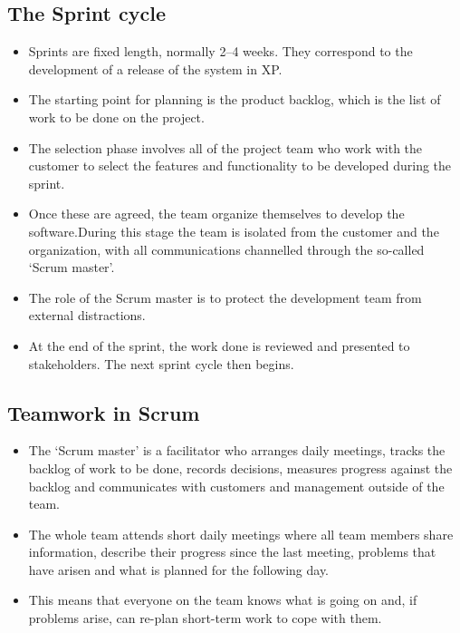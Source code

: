 \subsection{ The Sprint cycle}
\begin{itemize}

\item Sprints are fixed length, normally 2–4 weeks. They correspond to the development of a release of the system in XP.

\item The starting point for planning is the product backlog, which is the list of work to be done on the project.

\item The selection phase involves all of the project team who work with the customer to select the features and functionality to be developed during the sprint.


\item Once these are agreed, the team organize themselves to develop the software.During this stage the team is isolated from the customer and the organization, with all communications channelled through the so-called ‘Scrum master’.

\item The role of the Scrum master is to protect the development team from external distractions.

\item At the end of the sprint, the work done is reviewed and presented to stakeholders. The next sprint cycle then begins.


\end{itemize}
\subsection{ Teamwork in Scrum}
\begin{itemize}

\item The ‘Scrum master’ is a facilitator who arranges daily meetings, tracks the backlog of work to be done, records decisions, measures progress against the backlog and communicates with customers and management outside of the team.

\item The whole team attends short daily meetings where all team members share information, describe their progress since the last meeting, problems that have arisen and what is planned for the following day.

\item This means that everyone on the team knows what is going on and, if problems arise, can re-plan short-term work to cope with them.

\end{itemize}
